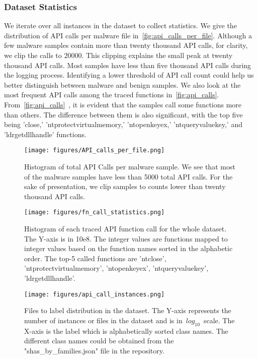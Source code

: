 \subsubsection{Dataset Statistics}
\label{subsubsec:dataset_statistics}
We iterate over all instances in the dataset to collect statistics. 
We give the distribution of API calls per malware file in~\autoref{fig:api_calls_per_file}.
Although a few malware samples contain more than twenty thousand API calls, for clarity, we clip the calls to $20000$.
This clipping explains the small peak at twenty thousand API calls. 
Most samples have less than five thousand API calls during the logging process.
Identifying a lower threshold of API call count could help us better distinguish between malware and benign samples. 
We also look at the most frequent API calls among the traced functions in~\autoref{fig:api_calls}. From~\autoref{fig:api_calls}~, it is evident that the samples call some functions more than others. 
The difference between them is also significant, with the top five being  'close,' 'ntprotectvirtualmemory,' 'ntopenkeyex,' 'ntqueryvaluekey,' and 'ldrgetdllhandle' functions.
\begin{figure}
    \centering
    \texttt{[image: figures/API\_calls\_per\_file.png]}
    \caption{Histogram of total API Calls per malware sample. We see that most of the malware samples have less than 5000 total API calls. For the sake of presentation, we clip samples to counts lower than twenty thousand API calls.}
    \label{fig:api_calls_per_file}
\end{figure}
\begin{figure}
    \centering
    \texttt{[image: figures/fn\_call\_statistics.png]}
    \caption{Histogram of each traced API function call for the whole dataset. The Y-axis is in 10e8. The integer values are functions mapped to integer values based on the function names sorted in the alphabetic order. The top-5 called functions are 'ntclose', 'ntprotectvirtualmemory', 'ntopenkeyex', 'ntqueryvaluekey', 'ldrgetdllhandle'.}
    \label{fig:api_calls}
\end{figure}
\begin{figure*}
    \centering
    \texttt{[image: figures/api\_call\_instances.png]}
    \caption{Files to label distribution in the dataset. The Y-axis represents the number of instances or files in the dataset and is in~$log_{10}$~scale. The X-axis is the label which is alphabetically sorted class names. The different class names could be obtained from the "shas\_by\_families.json" file in the repository.}
    \label{fig:label_distribution}
\end{figure*}
